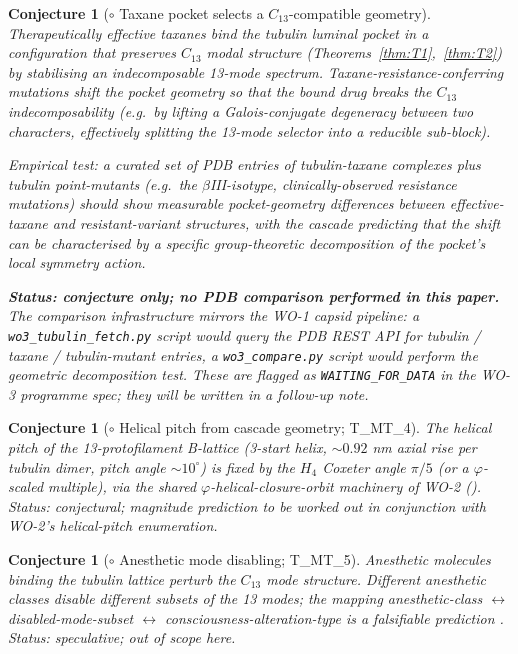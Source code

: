 \documentclass[12pt]{article}
\newtheorem{conjecture}[theorem]{Conjecture}
\newcommand{\phig}{\varphi}
\begin{document}
\begin{conjecture}[$\circ$ Taxane pocket selects a $C_{13}$-compatible geometry]\label{conj:C1}
Therapeutically effective taxanes bind the tubulin luminal pocket
in a configuration that preserves $C_{13}$ modal structure
(Theorems~\ref{thm:T1},~\ref{thm:T2}) by stabilising an
indecomposable 13-mode spectrum. Taxane-resistance-conferring
mutations shift the pocket geometry so that the bound drug
breaks the $C_{13}$ indecomposability (e.g.\ by lifting a
Galois-conjugate degeneracy between two characters, effectively
splitting the 13-mode selector into a reducible sub-block).

\emph{Empirical test:} a curated set of PDB entries of
tubulin-taxane complexes plus tubulin point-mutants (e.g.\ the
$\beta$III-isotype, clinically-observed resistance mutations)
should show measurable pocket-geometry differences between
effective-taxane and resistant-variant structures, with the
cascade predicting that the shift can be characterised by a
specific group-theoretic decomposition of the pocket's local
symmetry action.

\textbf{Status: conjecture only; no PDB comparison performed in
this paper.} The comparison infrastructure mirrors the WO-1
capsid pipeline: a \texttt{wo3\_tubulin\_fetch.py} script would
query the PDB REST API for tubulin / taxane / tubulin-mutant
entries, a \texttt{wo3\_compare.py} script would perform the
geometric decomposition test. These are flagged as
\texttt{WAITING\_FOR\_DATA} in the WO-3 programme spec; they
will be written in a follow-up note.
\end{conjecture}

\begin{conjecture}[$\circ$ Helical pitch from cascade geometry; T\_MT\_4]\label{conj:C2}
The helical pitch of the 13-protofilament B-lattice (3-start
helix, $\sim 0.92$ nm axial rise per tubulin dimer, pitch angle
$\sim 10^{\circ}$) is fixed by the $H_4$ Coxeter angle $\pi/5$
(or a $\phig$-scaled multiple), via the shared
$\phig$-helical-closure-orbit machinery of WO-2
(\cite{SmartAmyloid}). Status: conjectural; magnitude prediction
to be worked out in conjunction with WO-2's helical-pitch
enumeration.
\end{conjecture}

\begin{conjecture}[$\circ$ Anesthetic mode disabling; T\_MT\_5]\label{conj:C3}
Anesthetic molecules binding the tubulin lattice perturb the
$C_{13}$ mode structure. Different anesthetic classes disable
different subsets of the 13 modes; the mapping anesthetic-class
$\leftrightarrow$ disabled-mode-subset $\leftrightarrow$
consciousness-alteration-type is a falsifiable prediction
\cite[T\_MT\_5]{CascadePhotonMicrotubuleAlpha}. Status:
speculative; out of scope here.
\end{conjecture}
\end{document}
